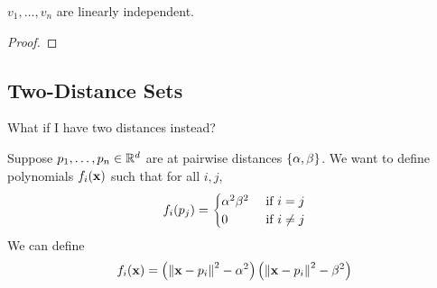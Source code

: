 \begin{claim*}
    $v_1, \ldots, v_n$ are linearly independent.
\end{claim*}
\begin{proof}
    \sorry %
\end{proof}

\sorry %

\subsection{Two-Distance Sets}

What if I have two distances instead?

Suppose $p_1, \ldots, p_n \in \mathbb{R}^d$ are at pairwise distances $\left\{ \alpha, \beta \right\}$. We want to define polynomials $f_i(\mathbf{x})$ such that for all $i, j$,
\begin{align*}
    f_i\!\left( p_j \right) = 
    \begin{cases}
        \alpha^2 \beta^2 & \text{ if } i = j \\
        0 & \text{ if } i \neq j
    \end{cases}
\end{align*}
We can define
\begin{align*}
    f_i(\mathbf{x}) = \left( \left\lVert \mathbf{x} - p_i \right\rVert^2 - \alpha^2 \right)\left( \left\lVert \mathbf{x} - p_i \right\rVert^2 - \beta^2 \right)
\end{align*}

\sorry %

